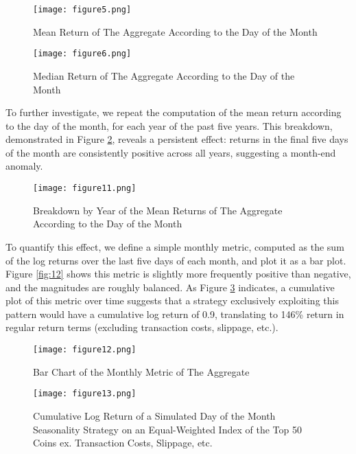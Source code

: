\documentclass[
]{article}
\begin{document}
\begin{figure}
    \centering
    \begin{minipage}{0.45\textwidth}
        \centering
        \texttt{[image: figure5.png]}
        \caption{Mean Return of The Aggregate According to the Day of the Month}
        \label{fig:9}
    \end{minipage}
    \hfill
    \begin{minipage}{0.45\textwidth}
        \centering
        \texttt{[image: figure6.png]}
        \caption{Median Return of The Aggregate According to the Day of the Month}
        \label{fig:10}
    \end{minipage}
\end{figure}

To further investigate, we repeat the computation of the mean return
according to the day of the month, for each year of the past five years.
This breakdown, demonstrated in Figure \textcolor{blue}{\ref{fig:11}},
reveals a persistent effect: returns in the final five days of the month
are consistently positive across all years, suggesting a month-end
anomaly.

\begin{figure}[H]
    \centering
    \texttt{[image: figure11.png]}
    \caption{Breakdown by Year of the Mean Returns of The Aggregate According to the Day of the Month}
    \label{fig:11}
\end{figure}

To quantify this effect, we define a simple monthly metric, computed as
the sum of the log returns over the last five days of each month, and
plot it as a bar plot. Figure \textcolor{blue}{\ref{fig:12}} shows this
metric is slightly more frequently positive than negative, and the
magnitudes are roughly balanced. As Figure
\textcolor{blue}{\ref{fig:13}} indicates, a cumulative plot of this
metric over time suggests that a strategy exclusively exploiting this
pattern would have a cumulative log return of 0.9, translating to 146\%
return in regular return terms (excluding transaction costs, slippage,
etc.).

\begin{figure}[H]
    \centering
    \begin{minipage}{0.45\textwidth}
        \centering
        \texttt{[image: figure12.png]}
        \caption{Bar Chart of the Monthly Metric of The Aggregate}
        \label{fig:12}
    \end{minipage}
    \hfill
    \begin{minipage}{0.45\textwidth}
        \centering
        \texttt{[image: figure13.png]}
        \caption{Cumulative Log Return of a Simulated Day of the Month Seasonality Strategy on an Equal-Weighted Index of the Top 50 Coins ex. Transaction Costs, Slippage, etc.}
        \label{fig:13}
    \end{minipage}
\end{figure}
\end{document}
